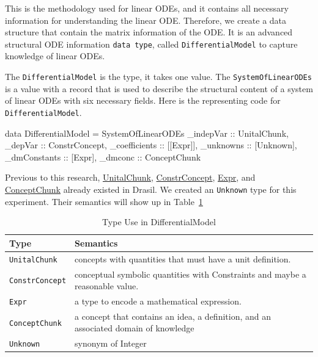 This is the methodology used for linear ODEs, and it contains all necessary information for understanding the linear ODE. Therefore, we create a data structure that contain the matrix information of the ODE. It is an advanced structural ODE information \verb|data type|, called \verb|DifferentialModel| to capture knowledge of linear ODEs.

The \verb|DifferentialModel| is the type, it takes one value. The \verb|SystemOfLinearODEs| is a value with a record that is used to describe the structural content of a system of linear ODEs with six necessary fields. Here is the representing code for \verb|DifferentialModel|.
\begin{haskell1}
data DifferentialModel = SystemOfLinearODEs {
	_indepVar :: UnitalChunk,
	_depVar :: ConstrConcept,
	_coefficients :: [[Expr]],
	_unknowns :: [Unknown],
	_dmConstants :: [Expr],
	_dmconc :: ConceptChunk
}
\end{haskell1}

Previous to this research, \href{https://jacquescarette.github.io/Drasil/docs/full/drasil-lang-0.1.60.0/Language-Drasil-Chunk-Unital.html#t:UnitalChunk}{UnitalChunk}, \href{https://jacquescarette.github.io/Drasil/docs/full/drasil-lang-0.1.60.0/Language-Drasil-Chunk-Constrained.html#t:ConstrConcept}{ConstrConcept}, \href{https://jacquescarette.github.io/Drasil/docs/full/drasil-lang-0.1.60.0/Language-Drasil-Expr-Lang.html#t:Expr}{Expr}, and \href{https://jacquescarette.github.io/Drasil/docs/full/drasil-lang-0.1.60.0/Language-Drasil-Chunk-Concept-Core.html#t:ConceptChunk}{ConceptChunk} already existed in Drasil. We created an \verb|Unknown| type for this experiment. Their semantics will show up in Table~\ref{tab_demodeltype}
\begin{table}[ht]
	\begin{tabular}{ p{} p{} }
		\textbf{Type} & \textbf{Semantics} \\
		\toprule
		\verb|UnitalChunk| & concepts with quantities that must have a unit definition.\\
		\verb|ConstrConcept| & conceptual symbolic quantities with Constraints and maybe a reasonable value.\\
		\verb|Expr| & a type to encode a mathematical expression. \\
		\verb|ConceptChunk| & a concept that contains an idea, a definition, and an associated domain of knowledge\\
        \verb|Unknown|& synonym of Integer\\
		\bottomrule	
	\end{tabular}	
	\caption{Type Use in DifferentialModel}	
	\label{tab_demodeltype}
\end{table}


